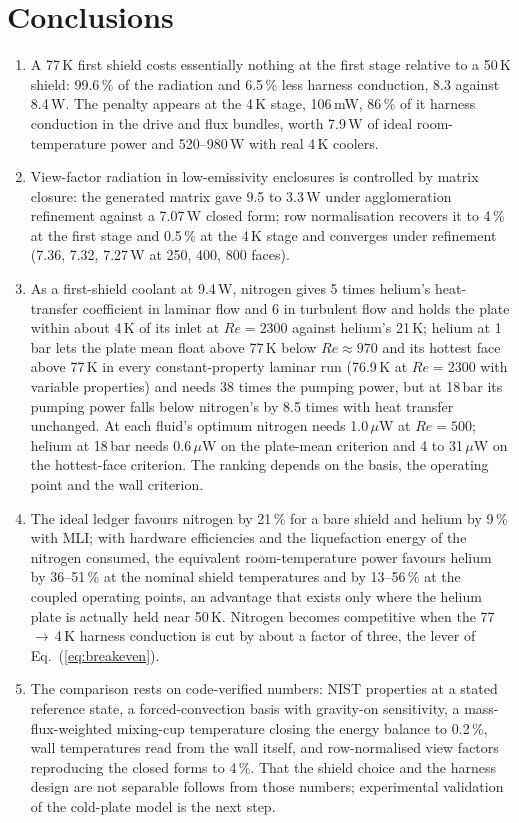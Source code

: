 \documentclass[preprint,12pt]{elsarticle}
\renewcommand{\Re}{\mathit{Re}}
\begin{document}
\section{Conclusions}
\label{sec:conclusions}

\begin{enumerate}
\item A 77\,K first shield costs essentially nothing at the first stage relative to a 50\,K
shield: 99.6\,\% of the radiation and 6.5\,\% less harness conduction, 8.3 against 8.4\,W. The
penalty appears at the 4\,K stage, 106\,mW, 86\,\% of it harness conduction in the drive and
flux bundles, worth 7.9\,W of ideal room-temperature power and 520--980\,W with real 4\,K
coolers.
\item View-factor radiation in low-emissivity enclosures is controlled by matrix closure: the
generated matrix gave 9.5 to 3.3\,W under agglomeration refinement against a 7.07\,W closed
form; row normalisation recovers it to 4\,\% at the first stage and 0.5\,\% at the 4\,K stage
and converges under refinement (7.36, 7.32, 7.27\,W at 250, 400, 800 faces).
\item As a first-shield coolant at 9.4\,W, nitrogen gives 5 times helium's heat-transfer
coefficient in laminar flow and 6 in turbulent flow and holds the plate within about 4\,K of
its inlet at $\Re=2300$ against helium's 21\,K; helium at 1\,bar lets the plate mean float
above 77\,K below $\Re\approx970$ and its hottest face above 77\,K in every constant-property
laminar run (76.9\,K at $\Re=2300$ with variable properties) and needs 38 times the pumping
power, but at 18\,bar its pumping power falls below nitrogen's by 8.5 times with heat transfer
unchanged. At each fluid's optimum nitrogen needs 1.0\,$\mu$W at $\Re=500$; helium at 18\,bar
needs 0.6\,$\mu$W on the plate-mean criterion and 4 to 31\,$\mu$W on the hottest-face
criterion. The ranking depends on the basis, the operating point and the wall criterion.
\item The ideal ledger favours nitrogen by 21\,\% for a bare shield and helium by 9\,\% with
MLI; with hardware efficiencies and the liquefaction energy of the nitrogen consumed, the
equivalent room-temperature power favours helium by 36--51\,\% at the nominal shield
temperatures and by 13--56\,\% at the coupled operating points, an advantage that exists only
where the helium plate is actually held near 50\,K. Nitrogen becomes competitive when the
77\,$\to$\,4\,K harness conduction is cut by about a factor of three, the lever of
Eq.~(\ref{eq:breakeven}).
\item The comparison rests on code-verified numbers: NIST properties at a stated reference
state, a forced-convection basis with gravity-on sensitivity, a mass-flux-weighted mixing-cup
temperature closing the energy balance to 0.2\,\%, wall temperatures read from the wall
itself, and row-normalised view factors reproducing the closed forms to 4\,\%. That the shield
choice and the harness design are not separable follows from those numbers; experimental
validation of the cold-plate model is the next step.
\end{enumerate}
\end{document}
